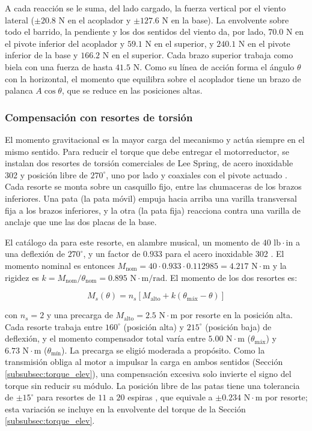 \documentclass[../../General.tex]{subfiles}
\begin{document}
A cada reacción se le suma, del lado cargado, la fuerza vertical por el viento lateral ($\pm 20.8\text{ N}$ en el acoplador y $\pm 127.6\text{ N}$ en la base). La envolvente sobre todo el barrido, la pendiente y los dos sentidos del viento da, por lado, $70.0\text{ N}$ en el pivote inferior del acoplador y $59.1\text{ N}$ en el superior, y $240.1\text{ N}$ en el pivote inferior de la base y $166.2\text{ N}$ en el superior. Cada brazo superior trabaja como biela con una fuerza de hasta $41.5\text{ N}$. Como su línea de acción forma el ángulo $\theta$ con la horizontal, el momento que equilibra sobre el acoplador tiene un brazo de palanca $A\cos\theta$, que se reduce en las posiciones altas.

\subsubsection{Compensación con resortes de torsión}\label{subsubsec:resortes_elev}

El momento gravitacional es la mayor carga del mecanismo y actúa siempre en el mismo sentido. Para reducir el torque que debe entregar el motorreductor, se instalan dos resortes de torsión comerciales de Lee Spring, de acero inoxidable 302 y posición libre de $270^\circ$, uno por lado y coaxiales con el pivote actuado \citep{leespring_torsion}. Cada resorte se monta sobre un casquillo fijo, entre las chumaceras de los brazos inferiores. Una pata (la pata móvil) empuja hacia arriba una varilla transversal fija a los brazos inferiores, y la otra (la pata fija) reacciona contra una varilla de anclaje que une las dos placas de la base.

El catálogo da para este resorte, en alambre musical, un momento de $40\text{ lb}\cdot\text{in}$ a una deflexión de $270^\circ$, y un factor de $0.933$ para el acero inoxidable 302 \citep{leespring_torsion}. El momento nominal es entonces $M_{\text{nom}} = 40 \cdot 0.933 \cdot 0.112985 = 4.217\text{ N}\cdot\text{m}$ y la rigidez es $k = M_{\text{nom}}/\theta_{\text{nom}} = 0.895\text{ N}\cdot\text{m/rad}$. El momento de los dos resortes es:

\begin{equation}\label{eq:Ms_elev}
    M_s(\theta) = n_s\left[M_{\text{alto}} + k\left(\theta_{\text{máx}} - \theta\right)\right]
\end{equation}

con $n_s = 2$ y una precarga de $M_{\text{alto}} = 2.5\text{ N}\cdot\text{m}$ por resorte en la posición alta. Cada resorte trabaja entre $160^\circ$ (posición alta) y $215^\circ$ (posición baja) de deflexión, y el momento compensador total varía entre $5.00\text{ N}\cdot\text{m}$ ($\theta_{\text{máx}}$) y $6.73\text{ N}\cdot\text{m}$ ($\theta_{\text{mín}}$). La precarga se eligió moderada a propósito. Como la transmisión obliga al motor a impulsar la carga en ambos sentidos (Sección \ref{subsubsec:torque_elev}), una compensación excesiva solo invierte el signo del torque sin reducir su módulo. La posición libre de las patas tiene una tolerancia de $\pm 15^\circ$ para resortes de $11$ a $20$ espiras \citep{leespring_torsion}, que equivale a $\pm 0.234\text{ N}\cdot\text{m}$ por resorte; esta variación se incluye en la envolvente del torque de la Sección \ref{subsubsec:torque_elev}.
\end{document}
